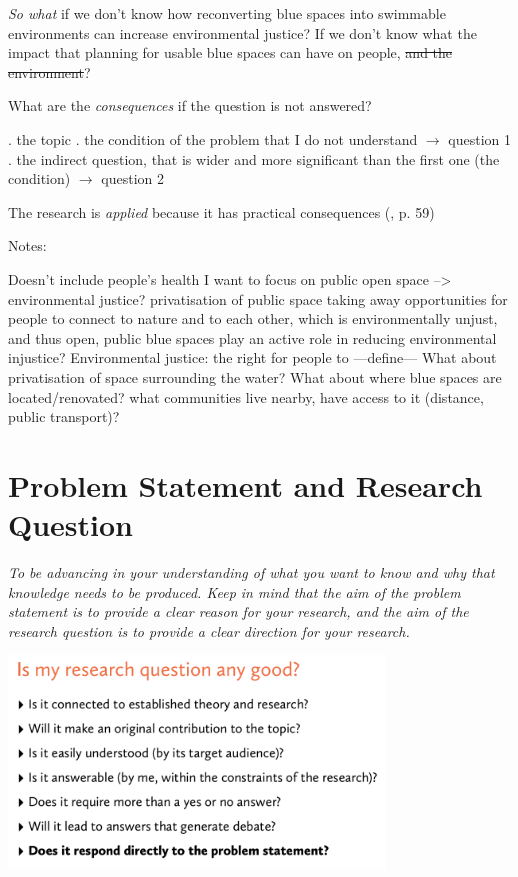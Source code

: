 \documentclass{article}
\begin{document}
\textit{So what} if we don't know how reconverting blue spaces into swimmable environments can increase environmental justice? If we don't know what the impact that planning for usable blue spaces can have on people, \sout{and the environment}?

What are the \textit{consequences} if the question is not answered?

\begin{outline}
	. the topic
	. the condition of the problem that I do not understand $\rightarrow$ question 1
	. the indirect question, that is wider and more significant than the first one (the condition) $\rightarrow$ question 2
\end{outline}
	
The research is \textit{applied} because it has practical consequences (\cite{booth2003craft}, p. 59)

Notes:

\begin{outline}
	\1 Doesn't include people's health
	\1 I want to focus on public open space --> environmental justice? privatisation of public space taking away opportunities for people to connect to nature and to each other, which is environmentally unjust, and thus open, public blue spaces play an active role in reducing environmental injustice? 
	\1 Environmental justice: the right for people to ---define---
	\1 What about privatisation of space surrounding the water?
	\1 What about where blue spaces are located/renovated? what communities live nearby, have access to it (distance, public transport)?
\end{outline}

\section{Problem Statement and Research Question}

\textit{To be advancing in your understanding of what you want to know and why that knowledge needs to be produced.
Keep in mind that the aim of the problem statement is to provide a clear reason for your research, and the aim of the research question is to provide a clear direction for your research.}

\includegraphics[width=0.75\textwidth]{research_question}
\end{document}
